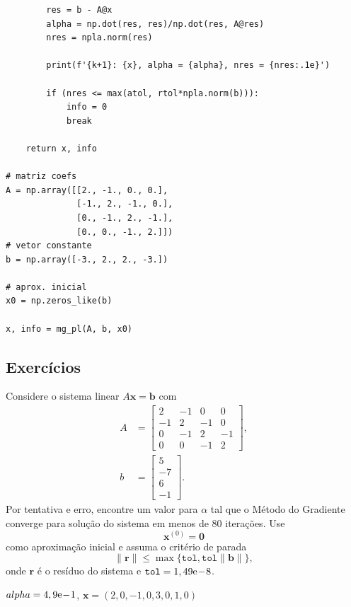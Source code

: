 \begin{ex}
\begin{lstlisting}
        res = b - A@x
        alpha = np.dot(res, res)/np.dot(res, A@res)
        nres = npla.norm(res)

        print(f'{k+1}: {x}, alpha = {alpha}, nres = {nres:.1e}')

        if (nres <= max(atol, rtol*npla.norm(b))):
            info = 0
            break

    return x, info
            
# matriz coefs
A = np.array([[2., -1., 0., 0.],
              [-1., 2., -1., 0.],
              [0., -1., 2., -1.],
              [0., 0., -1., 2.]])
# vetor constante
b = np.array([-3., 2., 2., -3.])

# aprox. inicial
x0 = np.zeros_like(b)

x, info = mg_pl(A, b, x0)
\end{lstlisting}
\end{ex}

\subsection*{Exercícios}

\begin{exer}\label{cap_sislin_sec_metg:exer:mg0}
  Considere o sistema linear $A\pmb{x} = \pmb{b}$ com
  \begin{align}
    A &=
    \begin{bmatrix}
      2 & -1 & 0 & 0\\
      -1 & 2 & -1 & 0\\
      0 & -1 & 2 & -1 \\
      0 & 0 & -1 & 2
    \end{bmatrix},\\
    b &=
    \begin{bmatrix}
      5\\
      -7\\
      6\\
      -1
    \end{bmatrix}.
  \end{align}
  Por tentativa e erro, encontre um valor para $\alpha$ tal que o Método do Gradiente converge para solução do sistema em menos de $80$ iterações. Use
  \begin{equation}
    \pmb{x}^{(0)} = \pmb{0}
  \end{equation}
  como aproximação inicial e assuma o critério de parada
  \begin{equation}
    \|\pmb{r}\| \leq \max\{\texttt{tol}, \texttt{tol}\|\pmb{b}\|\},
  \end{equation}
  onde $\pmb{r}$ é o resíduo do sistema e $\texttt{tol} = 1,49\mathrm{e}\!-\!8$.
\end{exer}
\begin{resp}
  $alpha = 4,9\mathrm{e}\!-\!1$, $\pmb{x} = \left(2,0, -1,0, 3,0, 1,0\right)$
\end{resp}

